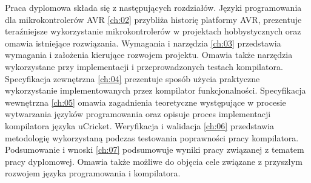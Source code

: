 Praca dyplomowa składa się z następujących rozdziałów. Języki programowania dla mikrokontrolerów AVR \ref{ch:02} przybliża historię platformy AVR, prezentuje teraźniejsze wykorzystanie mikrokontrolerów w projektach hobbystycznych oraz omawia istniejące rozwiązania. Wymagania i narzędzia \ref{ch:03} przedstawia wymagania i założenia kierujące rozwojem projektu. Omawia także narzędzia wykorzystane przy implementacji i przeprowadzonych testach kompilatora. Specyfikacja zewnętrzna \ref{ch:04} prezentuje sposób użycia praktyczne wykorzystanie implementowanych przez kompilator funkcjonalności. Specyfikacja wewnętrzna \ref{ch:05} omawia zagadnienia teoretyczne występujące w procesie wytwarzania języków programowania oraz opisuje proces implementacji kompilatora języka uCricket. Weryfikacja i walidacja \ref{ch:06} przedstawia metodologię wykorzystaną podczas testowania poprawności pracy kompilatora. Podsumowanie i wnoski \ref{ch:07} podsumowuje wyniki pracy związanej z tematem pracy dyplomowej. Omawia także możliwe do objęcia cele związane z przyszłym rozwojem języka programowania i kompilatora.


